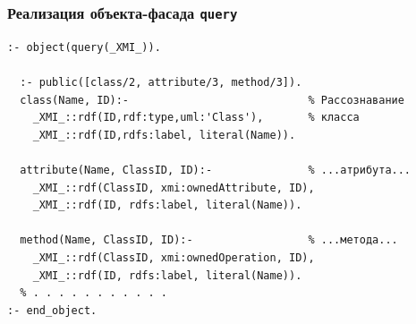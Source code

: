 \documentclass[10pt]{beamer}
\begin{document}
\begin{frame}[fragile]
  \frametitle{Реализация объекта-фасада \texttt{query}}
\begin{verbatim}
:- object(query(_XMI_)).

  :- public([class/2, attribute/3, method/3]).
  class(Name, ID):-                            % Рассознавание
    _XMI_::rdf(ID,rdf:type,uml:'Class'),       % класса
    _XMI_::rdf(ID,rdfs:label, literal(Name)).

  attribute(Name, ClassID, ID):-               % ...атрибута...
    _XMI_::rdf(ClassID, xmi:ownedAttribute, ID),
    _XMI_::rdf(ID, rdfs:label, literal(Name)).

  method(Name, ClassID, ID):-                  % ...метода...
    _XMI_::rdf(ClassID, xmi:ownedOperation, ID),
    _XMI_::rdf(ID, rdfs:label, literal(Name)).
  % . . . . . . . . . . .
:- end_object.
\end{verbatim}
\end{frame}
\end{document}
